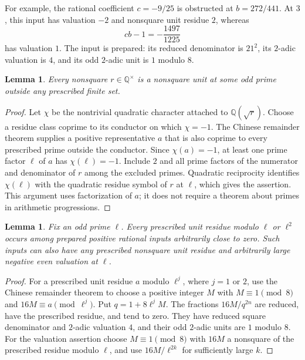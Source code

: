 \documentclass[10pt,a4paper]{article}
\newtheorem{lemma}[theorem]{Lemma}
\newcommand{\Q}{\mathbb Q}
\begin{document}
For example, the rational coefficient $c=-9/25$ is obstructed at
$b=272/441$. At $3$, this input has valuation $-2$ and nonsquare
unit residue $2$, whereas
\[
                 cb-1=-\frac{1497}{1225}
\]
has valuation $1$. The input is prepared: its reduced denominator is
$21^2$, its $2$-adic valuation is $4$, and its odd $2$-adic unit is
$1$ modulo $8$.

\begin{lemma}\label{lem:nonresidue}
Every nonsquare $r\in\Q^\times$ is a nonsquare unit at some odd
prime outside any prescribed finite set.
\end{lemma}
\begin{proof}
Let $\chi$ be the nontrivial quadratic character attached to
$\Q(\sqrt r)$. Choose a residue class coprime to its conductor
on which $\chi=-1$. The Chinese remainder theorem supplies a
positive representative $a$ that is also coprime to every prescribed
prime outside the conductor. Since $\chi(a)=-1$, at least one
prime factor $\ell$ of $a$ has $\chi(\ell)=-1$.
Include $2$ and all prime factors of the numerator and denominator of
$r$ among the excluded primes. Quadratic reciprocity identifies
$\chi(\ell)$ with the quadratic residue symbol of $r$ at $\ell$,
which gives the assertion. This argument uses factorization of $a$;
it does not require a theorem about primes in arithmetic progressions.
\end{proof}

\begin{lemma}\label{lem:prepared}
Fix an odd prime $\ell$.
Every prescribed unit residue modulo $\ell$ or $\ell^2$ occurs
among prepared positive rational inputs arbitrarily close to zero.
Such inputs can also have any prescribed nonsquare unit residue
and arbitrarily large negative even valuation at $\ell$.
\end{lemma}
\begin{proof}
For a prescribed unit residue $a$ modulo $\ell^j$, where $j=1$
or $2$, use the Chinese remainder theorem to choose a positive integer
$M$ with $M\equiv1\pmod8$ and $16M\equiv a\pmod{\ell^j}$.
Put $q=1+8\ell^jM$. The fractions $16M/q^{2n}$ are reduced,
have the prescribed residue, and tend to zero. They have reduced
square denominator and $2$-adic valuation $4$, and their odd
$2$-adic units are $1$ modulo $8$.
For the valuation assertion choose $M\equiv1\pmod8$ with $16M$
a nonsquare of the prescribed residue modulo $\ell$, and use
$16M/\ell^{2k}$ for sufficiently large $k$.
\end{proof}
\end{document}
